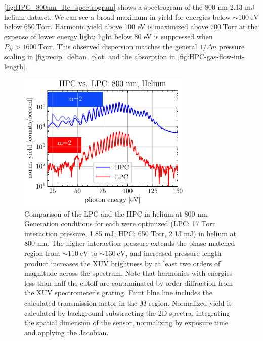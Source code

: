 \cref{fig:HPC_800nm_He_spectrogram} shows a spectrogram of the 800 nm 2.13 mJ helium dataset. We can see a broad maximum in yield for energies below $\sim 100 \ \textrm{eV}$ below $650 \ \textrm{Torr}$. Harmonic yield above 100 eV is maximized above $700 \ \textrm{Torr}$ at the expense of lower energy light; light below 80 eV is suppressed when $P_H > 1600 \ \textrm{Torr}$. This observed dispersion matches the general $1/\Delta n$ pressure scaling in \cref{fig:recip_deltan_plot} and the absorption in \cref{fig:HPC-gas-flow-int-length}.

\begin{figure}
	\centering
	\includegraphics[width=0.75\textwidth]{figures/chap3/HPC_vs_LPC_800He.pdf}
	\caption{Comparison of the LPC and the HPC in helium at 800 nm. Generation conditions for each were optimized (LPC: 17 Torr interaction pressure, 1.85 mJ; HPC: 650 Torr, 2.13 mJ) in helium at 800 nm. The higher interaction pressure extends the phase matched region from $ \sim 110 \ \textrm{eV}$ to $\sim 130 \ \textrm{eV}$, and increased pressure-length product increases the XUV brightness by at least two orders of magnitude across the spectrum. Note that harmonics with energies less than half the cutoff are contaminated by  order diffraction from the XUV spectrometer's grating. Faint blue line includes the calculated transmission factor in the $M$ region. Normalized yield is calculated by background substracting the 2D spectra, integrating the spatial dimension of the sensor, normalizing by exposure time and applying the Jacobian.}
	\label{fig:HHG-HPCvsLPCHPC}
\end{figure}

